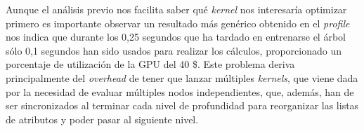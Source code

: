 Aunque el análisis previo nos facilita saber qué \textit{kernel} nos interesaría optimizar primero es importante observar un resultado más genérico obtenido en el \textit{profile} nos indica que durante los 0,25 segundos que ha tardado en entrenarse el árbol sólo 0,1 segundos han sido usados para realizar los cálculos, proporcionado un porcentaje de utilización de la GPU del 40 \$. Este problema deriva principalmente del \textit{overhead} de tener que lanzar múltiples \textit{kernels}, que viene dada por la necesidad de evaluar múltiples nodos independientes, que, además, han de ser sincronizados al terminar cada nivel de profundidad para reorganizar las listas de atributos y poder pasar al siguiente nivel.